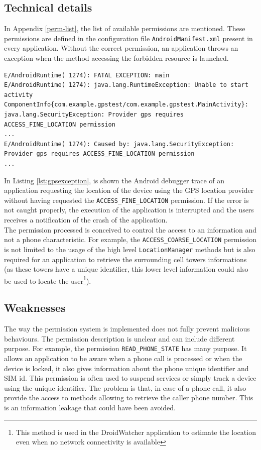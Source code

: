 \subsection{Technical details}
In Appendix \ref{perm-list}, the list of available permissions are mentioned.
These permissions are defined in the configuration file \texttt{AndroidManifest.xml} present in every application.
Without the correct permission, an application throws an exception when the method accessing the forbidden resource is launched.

\begin{lstlisting}[breaklines,caption={Example of permission violation log},label={lst:gpsexception},numbers=none]
E/AndroidRuntime( 1274): FATAL EXCEPTION: main
E/AndroidRuntime( 1274): java.lang.RuntimeException: Unable to start activity ComponentInfo{com.example.gpstest/com.example.gpstest.MainActivity}: java.lang.SecurityException: Provider gps requires ACCESS_FINE_LOCATION permission
...
E/AndroidRuntime( 1274): Caused by: java.lang.SecurityException: Provider gps requires ACCESS_FINE_LOCATION permission
...
\end{lstlisting}

In Listing \ref{lst:gpsexception}, is shown the Android debugger trace of an application requesting the location of the device using the GPS location provider without having requested the \texttt{ACCESS\_FINE\_LOCATION} permission.
If the error is not caught properly, the execution of the application is interrupted and the users receives a notification of the crash of the application.\\

The permission processed is conceived to control the access to an information and not a phone characteristic.
For example, the \texttt{ACCESS\_COARSE\_LOCATION} permission is not limited to the usage of the high level \texttt{LocationManager} methods but is also required for an application to retrieve the surrounding cell towers informations (as these towers have a unique identifier, this lower level information could also be used to locate the user\footnote{This method is used in the DroidWatcher application to estimate the location even when no network connectivity is available}).

\subsection{Weaknesses}

The way the permission system is implemented does not fully prevent malicious behaviours.
The permission description is unclear and can include different purpose.
For example, the permission \texttt{READ\_PHONE\_STATE} has many purpose.
It allows an application to be aware when a phone call is processed or when the device is locked, it also gives information about the phone unique identifier and SIM id.
This permission is often used to suspend services or simply track a device using the unique identifier.
The problem is that, in case of a phone call, it also provide the access to methods allowing to retrieve the caller phone number.
This is an information leakage that could have been avoided.\\

